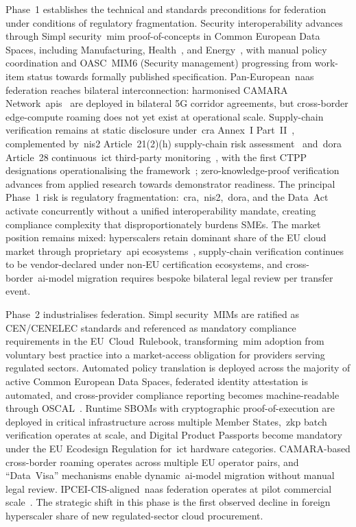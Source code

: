\documentclass{ieeeaccess}
\begin{document}
Phase~1 establishes the technical and standards preconditions for federation under conditions of regulatory fragmentation. Security interoperability advances through Simpl security~\gls{mim} proof-of-concepts in Common European Data Spaces, including Manufacturing, Health~\cite{ehds2025}, and Energy~\cite{ecsimpl,oascmim5,etsingsild}, with manual policy coordination and OASC~MIM6 (Security management) progressing from work-item status towards formally published specification. Pan-European~\gls{naas} federation reaches bilateral interconnection: harmonised CAMARA Network~\glspl{api}~\cite{camara2025} are deployed in bilateral 5G corridor agreements, but cross-border edge-compute roaming does not yet exist at operational scale. Supply-chain verification remains at static disclosure under~\gls{cra} Annex~I Part~II~\cite{eucra2024}, complemented by~\gls{nis2} Article~21(2)(h) supply-chain risk assessment~\cite{eunis2} and~\gls{dora} Article~28 continuous~\gls{ict} third-party monitoring~\cite{eudora}, with the first CTPP designations operationalising the framework~\cite{esa2025ctpp}; zero-knowledge-proof verification advances from applied research towards demonstrator readiness. The principal Phase~1 risk is regulatory fragmentation:~\gls{cra},~\gls{nis2},~\gls{dora}, and the Data~Act~\cite{eudataact} activate concurrently without a unified interoperability mandate, creating compliance complexity that disproportionately burdens SMEs. The market position remains mixed: hyperscalers retain dominant share of the EU cloud market through proprietary~\gls{api} ecosystems~\cite{synergy2025}, supply-chain verification continues to be vendor-declared under non-EU certification ecosystems, and cross-border~\gls{ai}-model migration requires bespoke bilateral legal review per transfer event.

Phase~2 industrialises federation. Simpl security~MIMs are ratified as CEN/CENELEC standards and referenced as mandatory compliance requirements in the EU~Cloud~Rulebook, transforming~\gls{mim} adoption from voluntary best practice into a market-access obligation for providers serving regulated sectors. Automated policy translation is deployed across the majority of active Common European Data Spaces, federated identity attestation is automated, and cross-provider compliance reporting becomes machine-readable through OSCAL~\cite{oscal2024,iorga2024oscal}. Runtime SBOMs with cryptographic proof-of-execution are deployed in critical infrastructure across multiple Member States,~\gls{zkp} batch verification operates at scale, and Digital Product Passports become mandatory under the EU Ecodesign Regulation for~\gls{ict} hardware categories. CAMARA-based cross-border roaming operates across multiple EU operator pairs, and ``Data~Visa'' mechanisms enable dynamic~\gls{ai}-model migration without manual legal review. IPCEI-CIS-aligned~\gls{naas} federation operates at pilot commercial scale~\cite{ipceicis2023}. The strategic shift in this phase is the first observed decline in foreign hyperscaler share of new regulated-sector cloud procurement.
\end{document}
